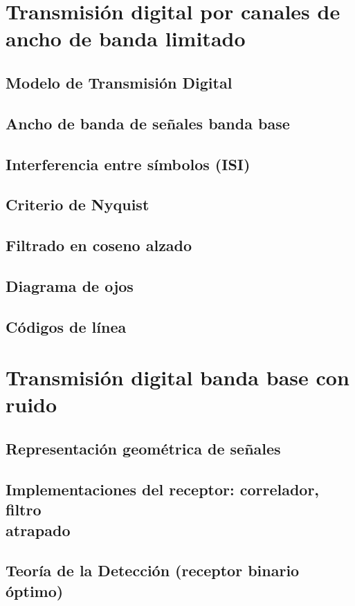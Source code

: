 \documentclass[a4paper]{book}
\begin{document}
\chapter{Transmisión digital por canales de ancho de banda limitado}
\section{Modelo de Transmisión Digital}
\section{Ancho de banda de señales banda base}
\section{Interferencia entre símbolos (ISI)}
\section{Criterio de Nyquist}
\section{Filtrado en coseno alzado}
\section{Diagrama de ojos}
\section{Códigos de línea}

\chapter{Transmisión digital banda base con ruido}
\section{Representación geométrica de señales}
\section{\texorpdfstring{Implementaciones del receptor: correlador, filtro\\ atrapado}{Implementaciones del receptor: correlador, filtro atrapado}}
\section{Teoría de la Detección (receptor binario óptimo)}
\end{document}
